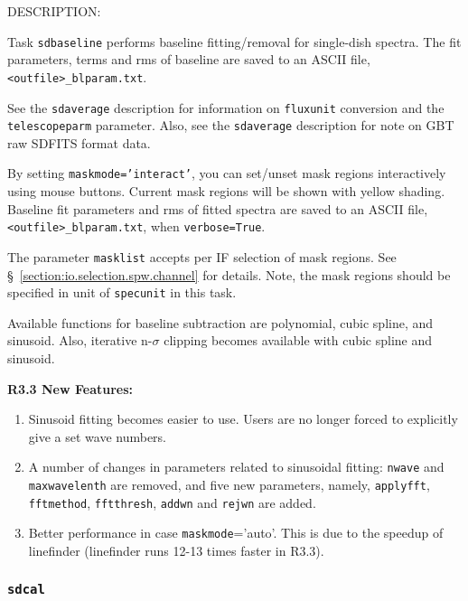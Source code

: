 DESCRIPTION:

Task {\tt sdbaseline} performs baseline fitting/removal for single-dish spectra.
The fit parameters, terms and rms of baseline are saved to an ASCII
file, {\tt <outfile>\_blparam.txt}.

See the {\tt sdaverage} description for information on {\tt fluxunit} 
conversion and the {\tt telescopeparm} parameter.
Also, see the {\tt sdaverage} description for note on GBT raw SDFITS format data.

By setting {\tt maskmode='interact'}, you can set/unset mask regions interactively using
mouse buttons. Current mask regions will be shown with yellow shading.
Baseline fit parameters and rms of fitted spectra are saved to an
ASCII file, {\tt <outfile>\_blparam.txt}, when {\tt verbose=True}.

The parameter {\tt masklist} accepts per IF selection of mask regions. 
See \S~\ref{section:io.selection.spw.channel} for details. 
Note, the mask regions should be specified in unit of {\tt specunit} 
in this task.

Available functions for baseline subtraction are polynomial, cubic spline, and sinusoid. 
Also, iterative n-$\sigma$ clipping becomes available with cubic spline and sinusoid. 


\medskip
{\bf R3.3 New Features:}
\begin{enumerate}
\item Sinusoid fitting becomes easier to use. Users are no longer forced 
      to explicitly give a set wave numbers. 
\item A number of changes in parameters related to sinusoidal fitting: 
      {\tt nwave} and {\tt maxwavelenth} are removed, and five new parameters, 
      namely, {\tt applyfft}, {\tt fftmethod}, {\tt fftthresh}, {\tt addwn} 
      and {\tt rejwn} are added.  
\item Better performance in case {\tt maskmode}='auto'. This is due to the 
      speedup of linefinder (linefinder runs 12-13 times faster in R3.3). 
\end{enumerate}
  
\subsubsection{{\tt sdcal}}
\label{section:sd.sdtasks.tasks.sdcal}


